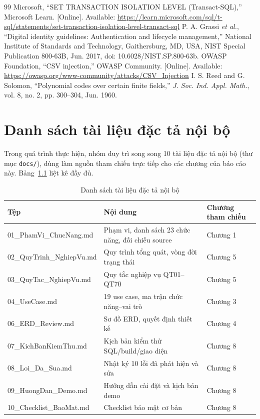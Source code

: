 \documentclass[14pt]{report}
\begin{document}
\begin{thebibliography}{99}
   Microsoft, ``SET TRANSACTION ISOLATION LEVEL (Transact-SQL),'' Microsoft Learn. [Online]. Available: \url{https://learn.microsoft.com/sql/t-sql/statements/set-transaction-isolation-level-transact-sql}
   P. A. Grassi \emph{et al.}, ``Digital identity guidelines: Authentication and lifecycle management,'' National Institute of Standards and Technology, Gaithersburg, MD, USA, NIST Special Publication 800-63B, Jun. 2017, doi: 10.6028/NIST.SP.800-63b.
   OWASP Foundation, ``CSV injection,'' OWASP Community. [Online]. Available: \url{https://owasp.org/www-community/attacks/CSV_Injection}
   I. S. Reed and G. Solomon, ``Polynomial codes over certain finite fields,'' \emph{J. Soc. Ind. Appl. Math.}, vol. 8, no. 2, pp. 300--304, Jun. 1960.
\end{thebibliography}



\appendix
\chapter{Danh sách tài liệu đặc tả nội bộ}

Trong quá trình thực hiện, nhóm duy trì song song 10 tài liệu đặc tả nội bộ (thư mục \texttt{docs/}), dùng làm nguồn tham chiếu trực tiếp cho các chương của báo cáo này. Bảng~\ref{tab:docs-list} liệt kê đầy đủ.

\begin{table}[H]
\centering
\caption{Danh sách tài liệu đặc tả nội bộ}
\label{tab:docs-list}
\begin{tabularx}{\textwidth}{|l|X|l|}
\hline
\textbf{Tệp} & \textbf{Nội dung} & \textbf{Chương tham chiếu} \\\hline
01\_PhamVi\_ChucNang.md & Phạm vi, danh sách 23 chức năng, đối chiếu source & Chương 1 \\\hline
02\_QuyTrinh\_NghiepVu.md & Quy trình tổng quát, vòng đời trạng thái & Chương 5 \\\hline
03\_QuyTac\_NghiepVu.md & Quy tắc nghiệp vụ QT01--QT70 & Chương 5 \\\hline
04\_UseCase.md & 19 use case, ma trận chức năng--vai trò & Chương 3 \\\hline
06\_ERD\_Review.md & Sơ đồ ERD, quyết định thiết kế & Chương 4 \\\hline
07\_KichBanKiemThu.md & Kịch bản kiểm thử SQL/build/giao diện & Chương 8 \\\hline
08\_Loi\_Da\_Sua.md & Nhật ký 10 lỗi đã phát hiện và sửa & Chương 8 \\\hline
09\_HuongDan\_Demo.md & Hướng dẫn cài đặt và kịch bản demo & Chương 8 \\\hline
10\_Checklist\_BaoMat.md & Checklist bảo mật cơ bản & Chương 8 \\\hline
\end{tabularx}
\end{table}
\end{document}
